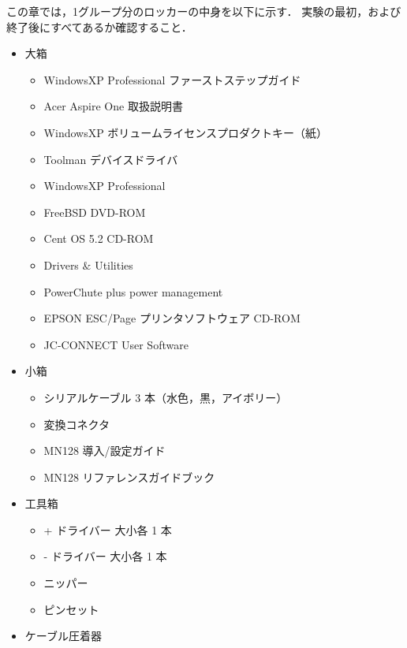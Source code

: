 この章では，1グループ分のロッカーの中身を以下に示す．
実験の最初，および終了後にすべてあるか確認すること．

\begin{itemize}
\item 大箱
    \begin{itemize}
    \item WindowsXP Professional ファーストステップガイド
    \item Acer Aspire One 取扱説明書
    \item WindowsXP ボリュームライセンスプロダクトキー（紙）
    \item Toolman デバイスドライバ
    \item WindowsXP Professional
    \item FreeBSD DVD-ROM
    \item Cent OS 5.2 CD-ROM
    \item Drivers $\&$ Utilities
    \item PowerChute plus power management
    \item EPSON ESC/Page プリンタソフトウェア CD-ROM
    \item JC-CONNECT User Software
    \end{itemize}
\item 小箱
    \begin{itemize}
    \item シリアルケーブル 3 本（水色，黒，アイボリー）
    \item 変換コネクタ
    \item MN128 導入/設定ガイド
    \item MN128 リファレンスガイドブック
    \end{itemize}

\item 工具箱
    \begin{itemize}
    \item + ドライバー 大小各 1 本
    \item - ドライバー 大小各 1 本
    \item ニッパー
    \item ピンセット
    \end{itemize}
\item ケーブル圧着器
\end{itemize}